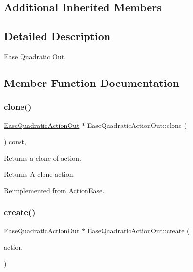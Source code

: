 \subsection*{Additional Inherited Members}


\subsection{Detailed Description}
Ease Quadratic Out. 

\subsection{Member Function Documentation}
\mbox{\label{classEaseQuadraticActionOut_a9621d836369fbaafdc3fda28846fe191}} 
\subsubsection{\texorpdfstring{clone()}{clone()}}
{\footnotesize\ttfamily \hyperlink{classEaseQuadraticActionOut}{Ease\+Quadratic\+Action\+Out} $\ast$ Ease\+Quadratic\+Action\+Out\+::clone (\begin{DoxyParamCaption}\item[{void}]{ }\end{DoxyParamCaption}) const\hspace{0.3cm}{\ttfamily [override]}, {\ttfamily [virtual]}}

Returns a clone of action.

\begin{DoxyReturn}{Returns}
A clone action. 
\end{DoxyReturn}


Reimplemented from \hyperlink{classActionEase_a39bec93fe161fb732a74d8e51a2fe08b}{Action\+Ease}.

\mbox{\label{classEaseQuadraticActionOut_a7e02c086ce740866ca9f5dadd0882ed5}} 
\subsubsection{\texorpdfstring{create()}{create()}}
{\footnotesize\ttfamily \hyperlink{classEaseQuadraticActionOut}{Ease\+Quadratic\+Action\+Out} $\ast$ Ease\+Quadratic\+Action\+Out\+::create (\begin{DoxyParamCaption}\item[{\hyperlink{classActionInterval}{Action\+Interval} $\ast$}]{action }\end{DoxyParamCaption})\hspace{0.3cm}{\ttfamily [static]}}



